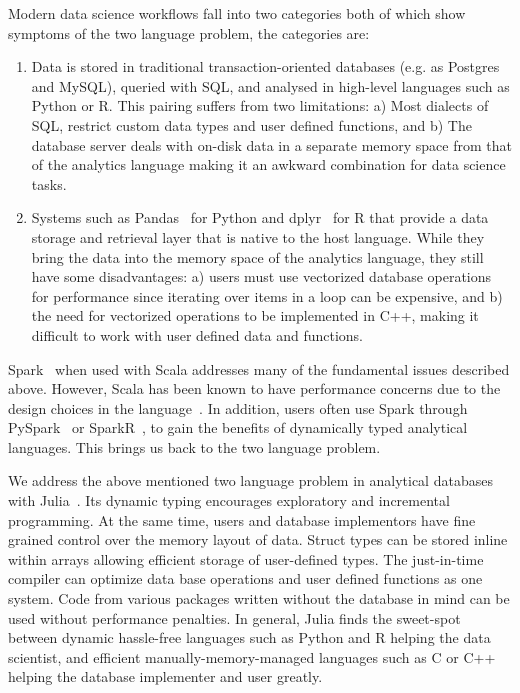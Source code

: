 \documentclass{juliacon}
\begin{document}
Modern data science workflows fall into two categories both of which show symptoms of the two language problem, the categories are:

\begin{enumerate}
\item Data is stored in traditional transaction-oriented databases (e.g. as Postgres and MySQL), queried with SQL, and analysed in high-level languages such as Python or R. This pairing suffers from two limitations: a) Most dialects of SQL, restrict custom data types and user defined functions, and b) The database server deals with on-disk data in a separate memory space from that of the analytics language making it an awkward combination for data science tasks.

\item Systems such as Pandas~\cite{mckinney-proc-scipy-2010} for Python and dplyr~\cite{dplyr} for R that provide a data storage and retrieval layer that is native to the host language. While they bring
the data into the memory space of the analytics language, they still
have some disadvantages: a) users must use vectorized database operations for performance since iterating over items in a loop can be expensive, and b) the need for vectorized operations to be 
implemented in C++, making it difficult to work with user defined data and functions. 
\end{enumerate}

Spark~\cite{spark} when used with Scala addresses many of the fundamental issues described above. However, Scala has been known to have performance concerns due to the design choices in the language~\cite{scalaslow}. In addition, users often use Spark through PySpark~\cite{pyspark} or SparkR~\cite{sparkr}, to gain the benefits of dynamically typed analytical languages. This brings us back to the two language problem.

We address the above mentioned two language problem in analytical databases with Julia~\cite{bezanson2017julia}. Its dynamic typing encourages exploratory and incremental programming. At the same time, users and database implementors have fine grained control over the memory layout of data. Struct types can be stored inline within arrays allowing efficient storage of user-defined
types. The just-in-time compiler can optimize data base operations and user defined functions as one system. Code from various packages written without the database in mind
can be used without performance penalties. In general, Julia finds the sweet-spot between dynamic
hassle-free languages such as Python and R helping the data scientist,
and efficient manually-memory-managed languages such as C or C++ helping
the database implementer and user greatly.
\end{document}
